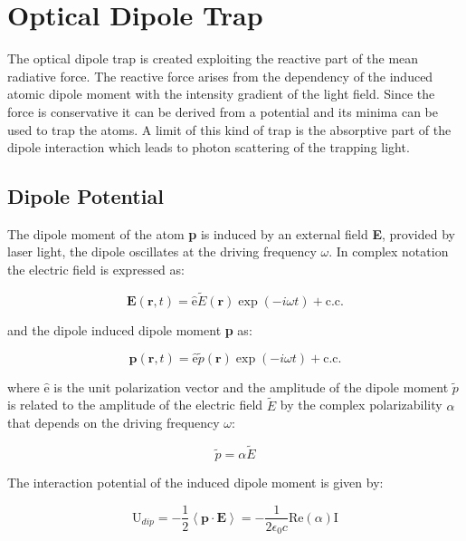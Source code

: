 \documentclass[../thesis.tex]{subfiles}
\begin{document}
\chapter{Optical Dipole Trap}

The optical dipole trap is created exploiting the reactive part of the mean radiative force. The reactive force arises from the dependency of the induced atomic dipole moment with the intensity gradient of the light field. Since the force is conservative it can be derived from a potential and its minima can be used to trap the atoms. A limit of this kind of trap is the absorptive part of the dipole interaction which leads to photon scattering of the trapping light.\\

\section{Dipole Potential}

The dipole moment of the atom \textbf{p} is induced by an external field \textbf{E}, provided by laser light, the dipole oscillates at the driving frequency $\omega$. In complex notation the electric field is expressed as:

\begin{equation}
\textbf{E}(\textbf{r},t) = \hat{\text{e}} \tilde{E}(\textbf{r}) \exp(-i \omega t) + \text{c.c.}
\end{equation}

and the dipole induced dipole moment \textbf{p} as:

\begin{equation}
\textbf{p}(\textbf{r},t) = \hat{\text{e}} \tilde{p}(\textbf{r}) \exp(-i \omega t) + \text{c.c.}
\end{equation}

where $\hat{\text{e}}$ is the unit polarization vector and the amplitude of the dipole moment $\tilde{p}$ is related to the amplitude of the electric field $\tilde{E}$ by the complex polarizability $\alpha$ that depends on the driving frequency $\omega$:

\begin{equation}
\tilde{p} = \alpha \tilde{E}
\end{equation}

The interaction potential of the induced dipole moment is given by:

\begin{equation}
\text{U}_{dip} = - \frac{1}{2} \left\langle \textbf{p} \cdot \textbf{E} \right\rangle = - \frac{1}{2 \epsilon_0 c} \text{Re}(\alpha) \text{I}
\end{equation}
\end{document}
